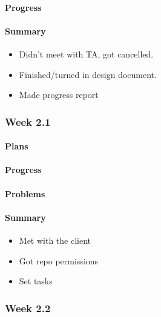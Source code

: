 \documentclass[onecolumn, draftclsnofoot,10pt, compsoc]{article}
\begin{document}
		    \paragraph{Progress} \hfill \break

		    \paragraph{Summary} \hfill \break
		        \begin{itemize}
                    \item Didn't meet with TA, got cancelled.
                    \item Finished/turned in design document.
                    \item Made progress report
                \end{itemize}

		  \subsubsection{Week 2.1}
			\paragraph{Plans} \hfill \break


			\paragraph{Progress} \hfill \break

			\paragraph{Problems} \hfill \break


			\paragraph{Summary} \hfill \break
			    \begin{itemize}
                    \item Met with the client
                    \item Got repo permissions
                    \item Set tasks
                \end{itemize}

		\subsubsection{Week 2.2}
\end{document}
